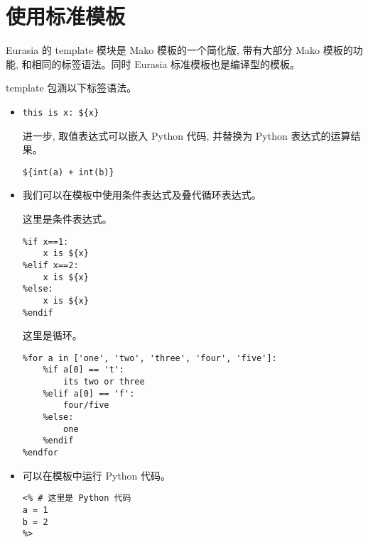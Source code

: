 \documentclass{manual}
\begin{document}

\section{使用标准模板}

Eurasia 的 template 模块是 Mako 模板的一个简化版, 带有大部分 Mako 模板的功能, 和相同的标签语法。同时 Eurasia 标准模板也是编译型的模板。

template 包涵以下标签语法。

\begin{itemize}

\item {}

\begin{verbatim}
this is x: ${x}
\end{verbatim}

进一步, 取值表达式可以嵌入 Python 代码, 并替换为 Python 表达式的运算结果。

\begin{verbatim}
${int(a) + int(b)}
\end{verbatim}

\item {}

我们可以在模板中使用条件表达式及叠代循环表达式。

这里是条件表达式。

\begin{verbatim}
%if x==1:
	x is ${x}
%elif x==2:
	x is ${x}
%else:
	x is ${x}
%endif
\end{verbatim}

这里是循环。

\begin{verbatim}
%for a in ['one', 'two', 'three', 'four', 'five']:
	%if a[0] == 't':
		its two or three
	%elif a[0] == 'f':
		four/five
	%else:
		one
	%endif
%endfor
\end{verbatim}

\item {}

可以在模板中运行 Python 代码。

\begin{verbatim}
<% # 这里是 Python 代码
a = 1
b = 2
%>


\end{verbatim}
\end{itemize}
\end{document}
